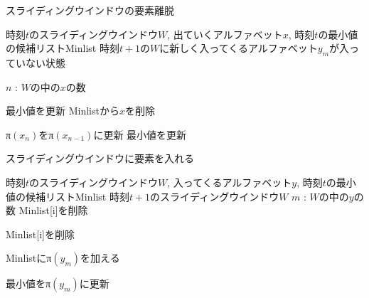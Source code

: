 \documentclass{IEEEtran}
\begin{document}
 \begin{algorithm}
 \caption{スライディングウインドウの要素離脱}
 \begin{algorithmic}[1]
 \renewcommand{\algorithmicrequire}{\textbf{Input:}}
 \renewcommand{\algorithmicensure}{\textbf{Output:}}
 \REQUIRE 時刻$t$のスライディングウインドウ$W$, 出ていくアルファベット$x$, 時刻$t$の最小値の候補リストMinlist
 \ENSURE  時刻$t+1$の$W$に新しく入ってくるアルファベット$y_m$が入っていない状態
 
 \STATE $n$ : $W$の中の$x$の数
 
  \STATE 最小値を更新
  \ENDIF
  \STATE Minlistから$x$を削除
  \ENDIF
 \ENDIF 
 
  \STATE π$(x_n)$をπ$(x_{n-1})$に更新
  \ENDIF
  \STATE 最小値を更新
  \ENDIF
 \ENDIF 
 
 \end{algorithmic} 
 \end{algorithm}

 \begin{algorithm}
 \caption{スライディングウインドウに要素を入れる}
 \begin{algorithmic}[2]
 \renewcommand{\algorithmicrequire}{\textbf{Input:}}
 \renewcommand{\algorithmicensure}{\textbf{Output:}}
 \REQUIRE 時刻$t$のスライディングウインドウ$W$, 入ってくるアルファベット$y$, 時刻$t$の最小値の候補リストMinlist
 \ENSURE  時刻$t+1$のスライディングウインドウ$W$
 \STATE $m$ : $W$の中の$y$の数
  \STATE Minlist[i]を削除
  \ENDIF
  
  \STATE Minlist[i]を削除
  \ENDIF
 \ENDFOR
 
 \STATE Minlistにπ$(y_m)$を加える
 
 \STATE 最小値をπ$(y_m)$に更新
 \ENDIF
 
 \end{algorithmic} 
 \end{algorithm}
 
\end{document}
